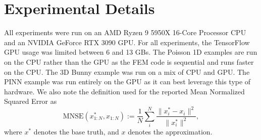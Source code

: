 \documentclass[11pt, fleqn]{article}
\begin{document}
\section{Experimental Details}
%
All experiments were run on an AMD Ryzen 9 5950X 16-Core Processor CPU and an NVIDIA GeForce RTX 3090 GPU. For all experiments, the TensorFlow GPU usage was limited between 6 and 13 GBs. The Poisson 1D examples are run on the CPU rather than the GPU as the \gls*{FEM} code is sequential and runs faster on the CPU. The 3D Bunny example was run on a mix of CPU and GPU. The PINN example was run entirely on the GPU as it can best leverage this type of hardware. We also note the definition used for the reported Mean Normalized Squared Error as 
\begin{equation}
    {\text{{MNSE}}}(x^{*}_{1:N}, x_{1:N}) := \frac{1}{N}\sum_i^N\frac{\|x^{*}_i - x_i\|^2}{\|x^{*}_i\|^2},
    \label{eq:MNSE}
\end{equation}
where $x^{*}$ denotes the base truth, and $x$ denotes the approximation.


\end{document}
